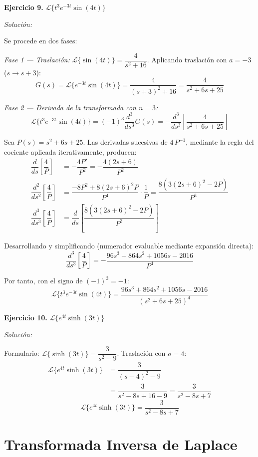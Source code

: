 \documentclass[12pt,letterpaper]{report}
\numberwithin{equation}{chapter}
\numberwithin{figure}{chapter}
\numberwithin{table}{chapter}
\begin{document}
\textbf{Ejercicio 9.} $\mathcal{L}\{t^3 e^{-3t}\sin(4t)\}$

\textit{Solución:}

Se procede en dos fases:

\textit{Fase 1 — Traslación:} $\mathcal{L}\{\sin(4t)\} = \dfrac{4}{s^2 + 16}$. Aplicando traslación con $a = -3$ ($s \to s + 3$):
\[
G(s) = \mathcal{L}\{e^{-3t}\sin(4t)\} = \dfrac{4}{(s+3)^2 + 16} = \dfrac{4}{s^2 + 6s + 25}
\]

\textit{Fase 2 — Derivada de la transformada con $n = 3$:}
\[
\mathcal{L}\{t^3 e^{-3t}\sin(4t)\} = (-1)^3\dfrac{d^3}{ds^3}G(s) = -\dfrac{d^3}{ds^3}\!\left[\dfrac{4}{s^2 + 6s + 25}\right]
\]

Sea $P(s) = s^2 + 6s + 25$. Las derivadas sucesivas de $4\,P^{-1}$, mediante la regla del cociente aplicada iterativamente, producen:
\begin{align*}
\dfrac{d}{ds}\!\left[\dfrac{4}{P}\right] &= -\dfrac{4P'}{P^2} = -\dfrac{4(2s + 6)}{P^2} \\[4pt]
\dfrac{d^2}{ds^2}\!\left[\dfrac{4}{P}\right] &= \dfrac{-8P^2 + 8(2s+6)^2 P}{P^4} \cdot \dfrac{1}{P} = \dfrac{8(3(2s+6)^2 - 2P)}{P^3} \\[4pt]
\dfrac{d^3}{ds^3}\!\left[\dfrac{4}{P}\right] &= \dfrac{d}{ds}\!\left[\dfrac{8(3(2s+6)^2 - 2P)}{P^3}\right]
\end{align*}

Desarrollando y simplificando (numerador evaluable mediante expansión directa):
\[
\dfrac{d^3}{ds^3}\!\left[\dfrac{4}{P}\right] = -\dfrac{96s^3 + 864s^2 + 1056s - 2016}{P^4}
\]

Por tanto, con el signo de $(-1)^3 = -1$:
\[
\boxed{\mathcal{L}\{t^3 e^{-3t}\sin(4t)\} = \dfrac{96s^3 + 864s^2 + 1056s - 2016}{(s^2 + 6s + 25)^4}}
\]

\textbf{Ejercicio 10.} $\mathcal{L}\{e^{4t}\sinh(3t)\}$

\textit{Solución:}

Formulario: $\mathcal{L}\{\sinh(3t)\} = \dfrac{3}{s^2 - 9}$. Traslación con $a = 4$:
\begin{align*}
\mathcal{L}\{e^{4t}\sinh(3t)\} &= \dfrac{3}{(s-4)^2 - 9} \\[4pt]
&= \dfrac{3}{s^2 - 8s + 16 - 9} = \dfrac{3}{s^2 - 8s + 7}
\end{align*}
\[
\boxed{\mathcal{L}\{e^{4t}\sinh(3t)\} = \dfrac{3}{s^2 - 8s + 7}}
\]


\section{Transformada Inversa de Laplace}
\end{document}
